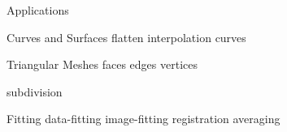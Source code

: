 \begin{plSection}{Applications}
\begin{plSection}{Curves and Surfaces}
{flatten}
{interpolation}
{curves}
\begin{plSection}{Triangular Meshes}
{faces}
{edges}
{vertices}
\end{plSection}%
{subdivision}
\begin{plSection}{Fitting}
{data-fitting}
{image-fitting}
{registration}
{averaging}
\end{plSection} %
\end{plSection}%
\end{plSection}%
\BeginAppendices

